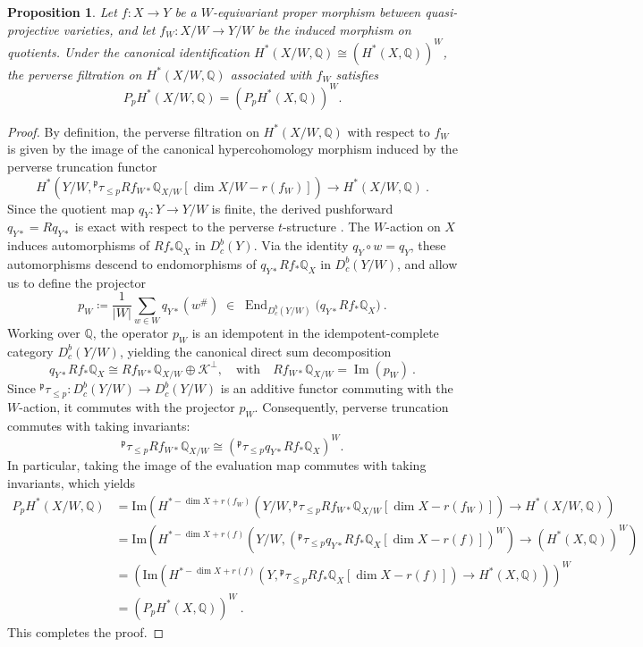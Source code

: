 \documentclass[11pt, a4paper]{amsart}
\newtheorem{proposition}[theorem]{Proposition}
\theoremstyle{definition}
\theoremstyle{myitemstyle}
\begin{document}
\begin{proposition}\label{prop:quotient-filtration}
		Let $f \colon X \to Y$ be a $W$-equivariant proper morphism between quasi-projective varieties, and let $f_W \colon X/W \to Y/W$ be the induced morphism on quotients. Under the canonical identification $H^*(X/W, \mathbb{Q}) \cong \left( H^*(X, \mathbb{Q}) \right)^W$, the perverse filtration on $H^*(X/W, \mathbb{Q})$ associated with $f_W$ satisfies
		\[
		P_p H^*(X/W, \mathbb{Q}) = \left( P_p H^*(X, \mathbb{Q}) \right)^W.
		\]
\end{proposition}
\begin{proof}
By definition, the perverse filtration on $H^*(X/W, \mathbb{Q})$  with respect to $f_W$ is given by the image of the canonical hypercohomology morphism induced by the perverse truncation functor
\[
H^*\left( Y/W, {}^{\mathfrak{p}}\tau_{\le p} Rf_{W*} \mathbb{Q}_{X/W}[\dim X/W-r(f_W)] \right) \longrightarrow H^*(X/W, \mathbb{Q})\ .
\]
Since the quotient map $q_Y \colon Y \to Y/W$ is finite, the derived pushforward $q_{Y*} = Rq_{Y*}$ is exact with respect to the perverse $t$-structure \cite[Corollaire 2.2.6]{BBD82}. The $W$-action on $X$ induces automorphisms of $R f_* \mathbb{Q}_X$ in $D^b_c(Y)$. Via the identity $q_Y \circ w = q_Y$, these automorphisms descend to endomorphisms of $q_{Y*} R f_* \mathbb{Q}_X$ in $D^b_c(Y/W)$, and allow us to define the projector
\[
p_W \coloneqq \frac{1}{|W|} \sum_{w \in W} q_{Y*}(w^\#) \;\in\; \operatorname{End}_{D^b_c(Y/W)}\big( q_{Y*} R f_* \mathbb{Q}_X \big)\ .
\]
Working over $\mathbb{Q}$, the operator $p_W$ is an idempotent in the idempotent-complete category $D^b_c(Y/W)$, yielding the canonical direct sum decomposition
\[
q_{Y*} R f_* \mathbb{Q}_X \cong Rf_{W*} \mathbb{Q}_{X/W} \oplus \mathcal{K}^\perp, \quad \text{with} \quad Rf_{W*} \mathbb{Q}_{X/W} = \operatorname{Im}(p_W)\ .
\]
Since ${}^{\mathfrak{p}}\tau_{\le p} \colon D^b_c(Y/W) \to D^b_c(Y/W)$ is an additive functor commuting with the $W$-action, it commutes with the projector $p_W$. Consequently, perverse truncation commutes with taking invariants:
\[
{}^{\mathfrak{p}}\tau_{\le p} Rf_{W*} \mathbb{Q}_{X/W} \cong \left( {}^{\mathfrak{p}}\tau_{\le p} q_{Y*} R f_* \mathbb{Q}_X \right)^W.
\]
In particular, taking the image of the evaluation map commutes with taking invariants, which yields
\begin{align*}
P_pH^*(X/W,\mathbb{Q})&=\mathrm{Im}\left( H^{*-\dim X+r(f_W)}\!\left(Y/W, {}^{\mathfrak{p}}\tau_{\le p} Rf_{W*} \mathbb{Q}_{X/W}[\dim X-r(f_W)] \right) \to H^*\!(X/W, \mathbb{Q}) \!\right) \\
        &= \mathrm{Im}\left( H^{*-\dim X+r(f)}\left( Y/W, \left( {}^{\mathfrak{p}}\tau_{\le p} q_{Y*}R f_* \mathbb{Q}_X[\dim X-r(f)] \right)^W \right) \rightarrow \left( H^*(X, \mathbb{Q}) \right)^W \right) \\
            &= \left( \mathrm{Im}\left( H^{*-\dim X+r(f)}\left( Y, {}^{\mathfrak{p}}\tau_{\le p} R f_* \mathbb{Q}_X [\dim X-r(f)]\right) \rightarrow H^*(X, \mathbb{Q}) \right) \right)^W \\
                &= \left( P_p H^*(X, \mathbb{Q}) \right)^W \ .
\end{align*}
This completes the proof.
\end{proof}
   
\end{document}
